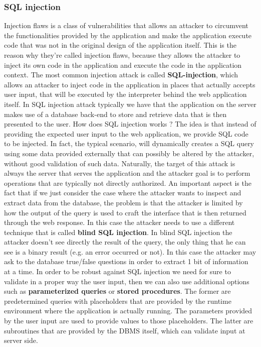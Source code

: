 \subsubsection{SQL injection}
Injection flaws is a class of vulnerabilities that allows an attacker to circumvent the functionalities provided by the application and make the application execute code that was not in the original design of the application itself. This is the reason why they're called injection flaws, because they allows the attacker to inject its own code in the application and execute the code in the application context. The most common injection attack is called \textbf{SQL-injection}, which allows an attacker to inject code in the application in places that actually accepts user input, that will be executed by the interpreter behind the web application itself. In SQL injection attack typically we have that the application on the server makes use of a database back-end to store and retrieve data that is then presented to the user. How does SQL injection works ? The idea is that instead of providing the expected user input to the web application, we provide SQL code to be injected. In fact, the typical scenario, will dynamically creates a SQL query using some data provided externally that can possibly be altered by the attacker, without good validation of such data. Naturally, the target of this attack is always the server that serves the application and the attacker goal is to perform operations that are typically not directly authorized. An important aspect is the fact that if we just consider the case where the attacker wants to inspect and extract data from the database, the problem is that the attacker is limited by how the output of the query is used to craft the interface that is then returned through the web response. In this case the attacker needs to use a different technique that is called \textbf{blind SQL injection}. In blind SQL injection the attacker doesn't see directly the result of the query, the only thing that he can see is a binary result (e.g. an error occurred or not). In this case the attacker may ask to the database true/false questions in order to extract 1 bit of information at a time. In order to be robust against SQL injection we need for sure to validate in a proper way the user input, then we can also use additional options such as \textbf{parameterized queries} or \textbf{stored procedures}. The former are predetermined queries with placeholders that are provided by the runtime environment where the application is actually running. The parameters provided by the user input are used to provide values to those placeholders. The latter are subroutines that are provided by the DBMS itself, which can validate input at server side.

